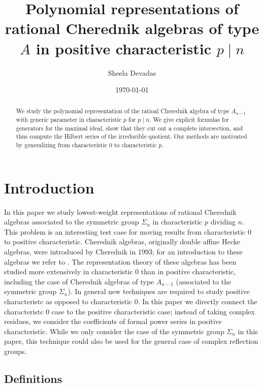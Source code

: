 \documentclass{article}
\title{Polynomial representations of rational Cherednik algebras of type $A$ in positive characteristic $p \mid n$}
\author{Sheela Devadas}
\date{\today}
\numberwithin{equation}{section}
\begin{document}
\maketitle

\begin{abstract}
We study the polynomial representation of the ratioal Cherednik algebra of type $A_{n-1}$ with generic parameter in characteristic $p$ for $p \mid n$. We give explicit formulas for generators for the maximal ideal, show that they cut out a complete intersection, and thus compute the Hilbert series of the irreducible quotient. Our methods are motivated by generalizing from characteristic $0$ to characteristic $p$. \end{abstract}

\section{Introduction}

In this paper we study lowest-weight representations of rational Cherednik algebras associated to the symmetric group $\Sigma_n$ in characteristic $p$ dividing $n$. This problem is an interesting test case for moving results from characteristic $0$ to positive characteristic. Cherednik algebras, originally double affine Hecke algebras, were introduced by Cherednik in 1993; for an introduction to these algebras we refer to \cite{EM}. The representation theory of these algebras has been studied more extensively in characteristic $0$ than in positive characteristic, including the case of Cherednik algebras of type $A_{n-1}$ (associated to the symmetric group $\Sigma_n$). In general new techniques are required to study positive characteristc as opposed to characteristic 0. In this paper we directly connect the characteristc 0 case to the positive characteristic case; instead of taking complex residues, we consider the coefficients of formal power series in positive characteristic. While we only consider the case of the symmetric group $\Sigma_n$ in this paper, this technique could also be used for the general case of complex reflection groups. %


\subsection{Definitions}
\end{document}
